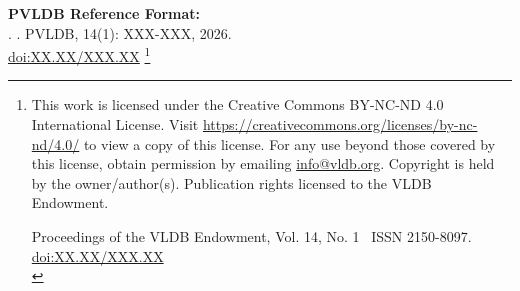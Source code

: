 \documentclass[sigconf, nonacm]{acmart}
\newcommand\vldbdoi{XX.XX/XXX.XX}
\newcommand\vldbpages{XXX-XXX}
\newcommand\vldbvolume{14}
\newcommand\vldbissue{1}
\newcommand\vldbyear{2026}
\newcommand\vldbauthors{\authors}
\newcommand\vldbtitle{\shorttitle}
\newcommand\vldbpagestyle{plain}
\begin{document}
\begin{abstract}

\end{abstract}

\maketitle


\pagestyle{\vldbpagestyle}
\begingroup\small\noindent\raggedright\textbf{PVLDB Reference Format:}\\
\vldbauthors. \vldbtitle. PVLDB, \vldbvolume(\vldbissue): \vldbpages, \vldbyear.\\
\href{https://doi.org/\vldbdoi}{doi:\vldbdoi}
\endgroup
\begingroup
\renewcommand\thefootnote{}\footnote{\noindent
This work is licensed under the Creative Commons BY-NC-ND 4.0 International License. Visit \url{https://creativecommons.org/licenses/by-nc-nd/4.0/} to view a copy of this license. For any use beyond those covered by this license, obtain permission by emailing \href{mailto:info@vldb.org}{info@vldb.org}. Copyright is held by the owner/author(s). Publication rights licensed to the VLDB Endowment. \\
\raggedright Proceedings of the VLDB Endowment, Vol. \vldbvolume, No. \vldbissue\ %
ISSN 2150-8097. \\
\href{https://doi.org/\vldbdoi}{doi:\vldbdoi} \\
}\addtocounter{footnote}{-1}\endgroup
\end{document}
